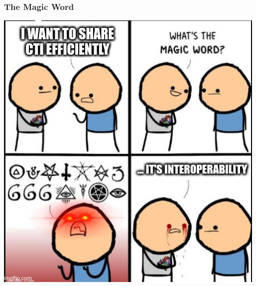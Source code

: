 \begin{frame}
\begin{minipage}{0.3\textwidth}
    \end{minipage}
\end{frame}

\begin{frame}
    \frametitle{The Magic Word}
    \centering
    \includegraphics[scale=0.41]{images/magic_word.png}
\end{frame}

